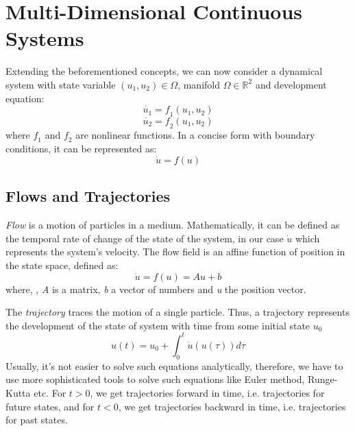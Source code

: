 \section{Multi-Dimensional Continuous Systems}
Extending the beforementioned concepts, we can now consider a dynamical system with state variable $(\textit{u}_{1},\textit{u}_{2})\in\Omega$, manifold $ \Omega\in\mathbb{R}^{2} $ and development equation:
\begin{equation}
\dot{\mathit{u}_{1}} = \textit{f}_{1}{\left( \mathit{u}_{1},\mathit{u}_{2}\right) }
\end{equation}
\begin{equation}
\dot{\mathit{u}_{2}} = \textit{f}_{2}{\left( \mathit{u}_{1},\mathit{u}_{2}\right) }
\end{equation}
where $\textit{f}_{1}$ and $\textit{f}_{2}$ are nonlinear functions. In a concise form with boundary conditions, it can be represented as:
\begin{equation}
\dot{\textit{u}} = \textit{f}{\left( \textit{u}\right) }
\end{equation}

\subsection{Flows and Trajectories}
\textit{Flow} is a motion of particles in a medium. Mathematically, it can be defined as the temporal rate of change of the state of the system, in our case $ \dot{\textit{u}} $ which represents the system’s velocity. The flow field is an affine function of position in the state space, defined as:
\begin{equation}
\dot{\mathit{u}} = \mathit{f}{\left( \mathit{u}\right) }=\mathit{Au + b}
\end{equation}
where, , \textit{A} is a matrix, \textit{b} a vector of numbers and \textit{u} the position vector.

The \textit{trajectory} traces the motion of a single particle. Thus, a trajectory represents the development of the state of system with time from some initial state $\textit{u}_{0}$
\begin{equation}
\mathit{u(t)}=\mathit{u}_{0}+\int_{0}^{t}\dot{\mathit{u}}(\mathit{u}(\tau))d\tau
\end{equation}
Usually, it’s not easier to solve such equations analytically, therefore, we have to use more sophisticated tools to solve such equations like Euler method, Runge-Kutta etc. For $\textit{t}>0$, we get trajectories forward in time, i.e. trajectories for future states, and for $\textit{t}<0$, we get trajectories backward in time, i.e. trajectories for past states.

